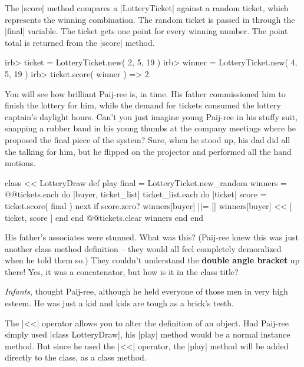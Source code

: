 \documentclass[12pt,twoside]{report}
\begin{document}
The \rubyinline|score| method compares a
\rubyinline|LotteryTicket| against a random ticket,
which represents the winning combination.  The random ticket is passed
in through the \rubyinline|final| variable.  The
ticket gets one point for every winning number.  The point total is
returned from the \rubyinline|score| method.


\begin{consolecode}

 irb> ticket = LotteryTicket.new( 2, 5, 19 )
 irb> winner = LotteryTicket.new( 4, 5, 19 )
 irb> ticket.score( winner )
   => 2

\end{consolecode}


You will see how brilliant Paij-ree is, in time.  His father
commissioned him to finish the lottery for him, while the demand for
tickets consumed the lottery captain's daylight hours.  Can't you just
imagine young Paij-ree in his stuffy suit, snapping a rubber band in
his young thumbs at the company meetings where he proposed the final
piece of the system?  Sure, when he stood up, his dad did all the
talking for him, but he flipped on the projector and performed all the
hand motions.


\begin{rubycode}

 class << LotteryDraw
   def play
     final = LotteryTicket.new_random
     winners = {}
     @@tickets.each do |buyer, ticket_list|
       ticket_list.each do |ticket|
         score = ticket.score( final )
         next if score.zero?
         winners[buyer] ||= []
         winners[buyer] << [ ticket, score ]
       end
     end
     @@tickets.clear
     winners
   end
 end

\end{rubycode}


His father's associates were stunned.  What was this?  (Paij-ree knew
this was just another class method definition -- they would all feel
completely demoralized when he told them so.)  They couldn't
understand the {\bf double angle bracket} up there!  Yes, it was a
concatenator, but how is it in the class title?

{\em Infants}, thought Paij-ree, although he held everyone of those
men in very high esteem.  He was just a kid and kids are tough as a
brick's teeth.

The \rubyinline|<<| operator allows you to alter the
definition of an object. Had Paij-ree simply used
\rubyinline|class LotteryDraw|, his
\rubyinline|play| method would be a normal instance
method.  But since he used the \rubyinline|<<|
operator, the \rubyinline|play| method will be added
directly to the class, as a class method.
\end{document}
